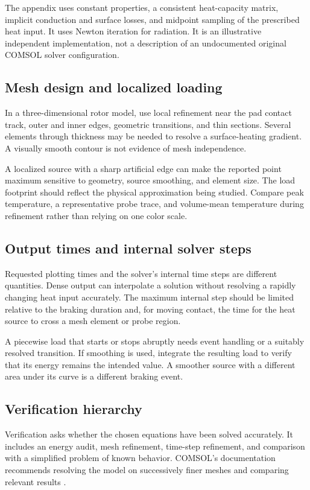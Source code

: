 \documentclass[11pt,a4paper]{article}
\begin{document}
The appendix uses constant properties, a consistent heat-capacity matrix, implicit conduction and surface losses, and midpoint sampling of the prescribed heat input. It uses Newton iteration for radiation. It is an illustrative independent implementation, not a description of an undocumented original COMSOL solver configuration.

\clearpage
\subsection{Mesh design and localized loading}
In a three-dimensional rotor model, use local refinement near the pad contact track, outer and inner edges, geometric transitions, and thin sections. Several elements through thickness may be needed to resolve a surface-heating gradient. A visually smooth contour is not evidence of mesh independence.

A localized source with a sharp artificial edge can make the reported point maximum sensitive to geometry, source smoothing, and element size. The load footprint should reflect the physical approximation being studied. Compare peak temperature, a representative probe trace, and volume-mean temperature during refinement rather than relying on one color scale.

\subsection{Output times and internal solver steps}
Requested plotting times and the solver's internal time steps are different quantities. Dense output can interpolate a solution without resolving a rapidly changing heat input accurately. The maximum internal step should be limited relative to the braking duration and, for moving contact, the time for the heat source to cross a mesh element or probe region.

A piecewise load that starts or stops abruptly needs event handling or a suitably resolved transition. If smoothing is used, integrate the resulting load to verify that its energy remains the intended value. A smoother source with a different area under its curve is a different braking event.

\subsection{Verification hierarchy}
Verification asks whether the chosen equations have been solved accurately. It includes an energy audit, mesh refinement, time-step refinement, and comparison with a simplified problem of known behavior. COMSOL's documentation recommends resolving the model on successively finer meshes and comparing relevant results \cite{mesh}.
\end{document}
